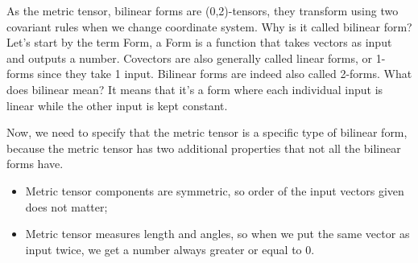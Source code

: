 As the metric tensor, bilinear forms are (0,2)-tensors, they transform using two covariant rules when we change
coordinate system.
Why is it called bilinear form?\\

Let's start by the term Form, a Form is a function that takes vectors as input and outputs a number.
Covectors are also generally called linear forms, or 1-forms since they take 1 input.
Bilinear forms are indeed also called 2-forms.
What does bilinear mean? It means that it's a form where each individual input is linear while the other input is kept constant.

Now, we need to specify that the metric tensor is a specific type of bilinear form, because the metric tensor
has two additional properties that not all the bilinear forms have.\\

\begin{itemize}
    \item Metric tensor components are symmetric, so order of the input vectors given does not matter;
    \item Metric tensor measures length and angles, so when we put the same vector as input twice, we get a number always greater or equal to 0.
\end{itemize}


